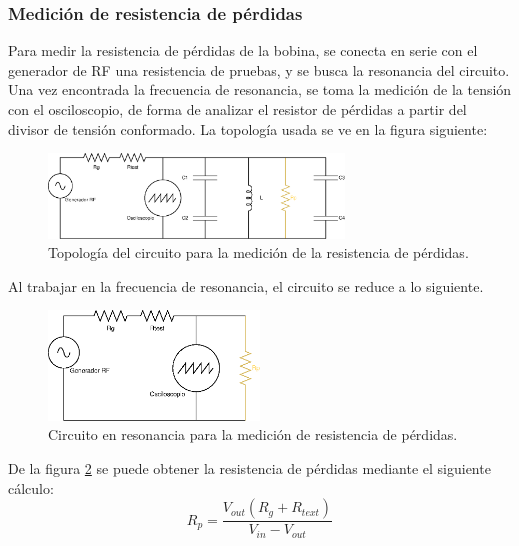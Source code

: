 \documentclass{article}
\begin{document}
\subsubsection{Medición de resistencia de pérdidas}
Para medir la resistencia de pérdidas de la bobina, se conecta en serie con el generador de RF una resistencia de pruebas, y se busca la resonancia del circuito. Una vez encontrada la frecuencia de resonancia, se toma la medición de la tensión con el osciloscopio, de forma de analizar el resistor de pérdidas a partir del divisor de tensión conformado. La topología usada se ve en la figura siguiente:
\begin{figure}[H]
\centering
\includegraphics[width=0.7\textwidth]{./img/figura22.eps}
\caption{Topología del circuito para la medición de la resistencia de pérdidas.}
\label{fig:circuito22}
\end{figure}
\noindent Al trabajar en la frecuencia de resonancia, el circuito se reduce a lo siguiente.
\begin{figure}[H]
\centering
\includegraphics[width=0.5\textwidth]{./img/figura23.eps}
\caption{Circuito en resonancia para la medición de resistencia de pérdidas.}
\label{fig:circuito23}
\end{figure}
De la figura \ref{fig:circuito23} se puede obtener la resistencia de pérdidas mediante el siguiente cálculo:
\begin{equation*}
    R_p = \frac{V_{out} (R_g + R_{text})}{V_{in}- V_{out}}
\end{equation*}
\end{document}
